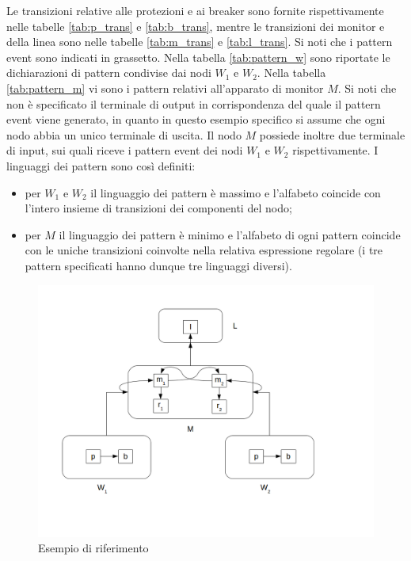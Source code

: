 \begin{ex}
Le transizioni relative alle protezioni e ai breaker sono fornite rispettivamente nelle tabelle \ref{tab:p_trans} e \ref{tab:b_trans}, mentre le transizioni dei monitor e della linea sono nelle tabelle \ref{tab:m_trans} e \ref{tab:l_trans}. Si noti che i pattern event sono indicati in grassetto.
Nella tabella \ref{tab:pattern_w} sono riportate le dichiarazioni di pattern condivise dai nodi $W_1$ e $W_2$. 
Nella tabella \ref{tab:pattern_m} vi sono i pattern relativi all'apparato di monitor $M$.
Si noti che non è specificato il terminale di output in corrispondenza del quale il pattern event viene generato, in quanto in questo esempio specifico si assume che ogni nodo abbia un unico terminale di uscita. Il nodo $M$ possiede inoltre due terminale di input, sui quali riceve i pattern event dei nodi $W_1$ e $W_2$ rispettivamente.
I linguaggi dei pattern sono così definiti:
\begin{itemize}
\item per $W_1$ e $W_2$ il linguaggio dei pattern è massimo e l'alfabeto coincide con l'intero insieme di transizioni dei componenti del nodo;
\item per $M$ il linguaggio dei pattern è minimo e l'alfabeto di ogni pattern coincide con le uniche transizioni coinvolte nella relativa espressione regolare (i tre pattern specificati hanno dunque tre linguaggi diversi).
\end{itemize}
\end{ex}

\begin{figure}[htbp]
\centering
\includegraphics[scale=0.4]{./Img/sac/sac.png}
\caption{Esempio di riferimento}
\label{fig:sac}
\end{figure}

